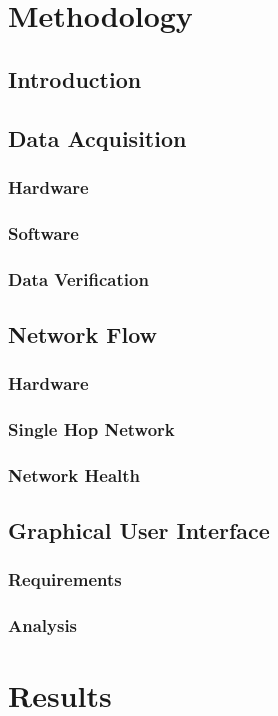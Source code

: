 \chapter{Methodology}
\section{Introduction}
\section{Data Acquisition}
\subsection{Hardware}
\subsection{Software}
\subsection{Data Verification}
\section{Network Flow}
\subsection{Hardware}
\subsection{Single Hop Network}
\subsection{Network Health}
\section{Graphical User Interface}
\subsection{Requirements}
\subsection{Analysis}

\chapter{Results}
